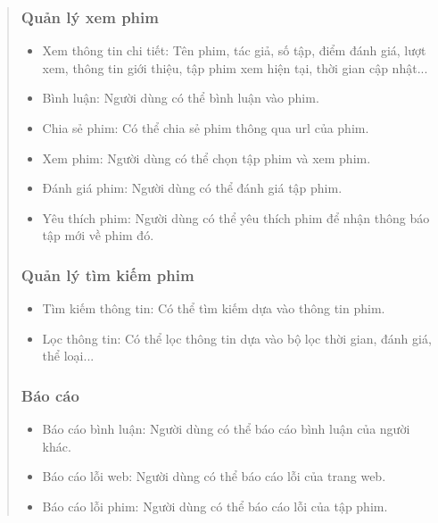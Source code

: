 \begin{quote}
\subsubsection{Quản lý xem phim}
\begin{itemize}
    \item Xem thông tin chi tiết: Tên phim, tác giả, số tập, điểm đánh giá, lượt xem, thông tin giới thiệu, tập phim xem hiện tại, thời gian cập nhật...
    \item Bình luận: Người dùng có thể bình luận vào phim.
    \item Chia sẻ phim: Có thể chia sẻ phim thông qua url của phim.
    \item Xem phim: Người dùng có thể chọn tập phim và xem phim.
    \item Đánh giá phim: Người dùng có thể đánh giá tập phim.
    \item Yêu thích phim: Người dùng có thể yêu thích phim để nhận thông báo tập mới về phim đó.
\end{itemize}

\subsubsection{Quản lý tìm kiếm phim}
\begin{itemize}
    \item Tìm kiếm thông tin: Có thể tìm kiếm dựa vào thông tin phim.
    \item Lọc thông tin: Có thể lọc thông tin dựa vào bộ lọc thời gian, đánh giá, thể loại...
    \end{itemize}

\subsubsection{Báo cáo}
\begin{itemize}
    \item Báo cáo bình luận: Người dùng có thể báo cáo bình luận của người khác.
    \item Báo cáo lỗi web: Người dùng có thể báo cáo lỗi của trang web.
    \item Báo cáo lỗi phim: Người dùng có thể báo cáo lỗi của tập phim.
\end{itemize}
    
\end{quote}


